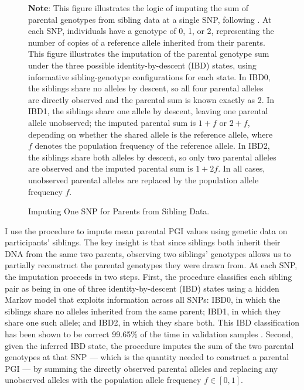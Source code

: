 \begin{figure}[!h]
    \centering
    \singlespacing
    \caption{Imputing One SNP for Parents from Sibling Data.}
    \label{fig:pgi-imputing}
    
    \justify
    \footnotesize
    \textbf{Note}:
    This figure illustrates the logic of imputing the sum of parental genotypes from sibling data at a single SNP, following \cite{young2022mendelian}.
    At each SNP, individuals have a genotype of 0, 1, or 2, representing the number of copies of a reference allele inherited from their parents.
    This figure illustrates the imputation of the parental genotype sum under the three possible identity-by-descent (IBD) states, using informative sibling-genotype configurations for each state.
    In IBD0, the siblings share no alleles by descent, so all four parental alleles are directly observed and the parental sum is known exactly as 2.
    In IBD1, the siblings share one allele by descent, leaving one parental allele unobserved; the imputed parental sum is $1 + f$ or $2+f$, depending on whether the shared allele is the reference allele, where $f$ denotes the population frequency of the reference allele.
    In IBD2, the siblings share both alleles by descent, so only two parental alleles are observed and the imputed parental sum is $1 + 2f$.
    In all cases, unobserved parental alleles are replaced by the population allele frequency $f$.
\end{figure}

I use the \cite{young2022mendelian} procedure to impute mean parental PGI values using genetic data on participants' siblings.
The key insight is that since siblings both inherit their DNA from the same two parents, observing two siblings' genotypes allows us to partially reconstruct the parental genotypes they were drawn from.
At each SNP, the imputation proceeds in two steps.
First, the procedure classifies each sibling pair as being in one of three identity-by-descent (IBD) states using a hidden Markov model that exploits information across all SNPs: IBD0, in which the siblings share no alleles inherited from the same parent; IBD1, in which they share one such allele; and IBD2, in which they share both.
This IBD classification has been shown to be correct 99.65\% of the time in validation samples \citep{young2022mendelian}.
Second, given the inferred IBD state, the procedure imputes the sum of the two parental genotypes at that SNP --- which is the quantity needed to construct a parental PGI --- by summing the directly observed parental alleles and replacing any unobserved alleles with the population allele frequency $f \in [0,1]$.

